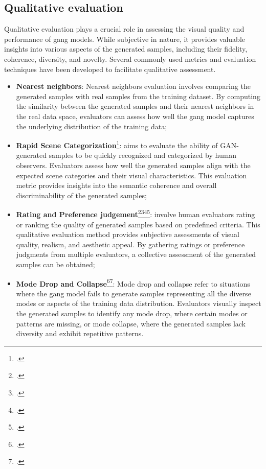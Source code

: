 \subsection{Qualitative evaluation}
\label{subsec:qualitative-evaluation}
Qualitative evaluation plays a crucial role in assessing the visual quality and performance of \gls{gang} models. 
While subjective in nature, it provides valuable insights into various aspects of the generated samples, including their fidelity, coherence, diversity, and novelty. 
Several commonly used metrics and evaluation techniques have been developed to facilitate qualitative assessment.
\begin{itemize}
    \item \textbf{Nearest neighbors}: Nearest neighbors evaluation involves comparing the generated samples with real samples from the training dataset. 
    By computing the similarity between the generated samples and their nearest neighbors in the real data space, evaluators can assess how well the \gls{gang} model captures the underlying distribution of the training data;
    \item \textbf{Rapid Scene Categorization}\footcite{paper:ganeval}: aims to evaluate the ability of GAN-generated samples to be quickly recognized and categorized by human observers. 
    Evaluators assess how well the generated samples align with the expected scene categories and their visual characteristics. This evaluation metric provides insights into the semantic coherence and overall discriminability of the generated samples;
    \item \textbf{Rating and Preference judgement}\footcite{paper:stackadvnet}\footcite{paper:stackadvnet1}\footcite{paper:stackadvnet2}\footcite{paper:stackadvnet3}:
    involve human evaluators rating or ranking the quality of generated samples based on predefined criteria. 
    This qualitative evaluation method provides subjective assessments of visual quality, realism, and aesthetic appeal. 
    By gathering ratings or preference judgments from multiple evaluators, a collective assessment of the generated samples can be obtained;
    \item \textbf{Mode Drop and Collapse}\footcite{paper:dropandcollapse}\footcite{paper:dropandcollapse2}: Mode drop and collapse refer to situations where the \gls{gang} model fails to generate samples representing all the diverse modes or aspects of the training data distribution. 
    Evaluators visually inspect the generated samples to identify any mode drop, where certain modes or patterns are missing, or mode collapse, where the generated samples lack diversity and exhibit repetitive patterns. 

\end{itemize}
